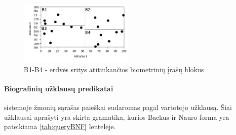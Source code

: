 \begin{figure}[H]
\begin{center}
\includegraphics[width=0.5\textwidth]{img/MultidimensionalPartitionedGallery.png}
\caption{B1-B4 - erdvės sritys atitinkančios biometrinių įrašų blokus}
\label{img:multidimensionalPartitionedGallery}
\end{center}
\end{figure}



\paragraph{Biografinių užklausų predikatai}

\cite{NeurotechnologyMegamatcherAccelerator} sistemoje žmonių sąrašas paieškai sudaromas pagal vartotojo užklausą.
Šiai užklausai aprašyti yra skirta gramatika, kurios Backus ir Nauro forma yra pateikiama \ref{tab:queryBNF} lentelėje. %

